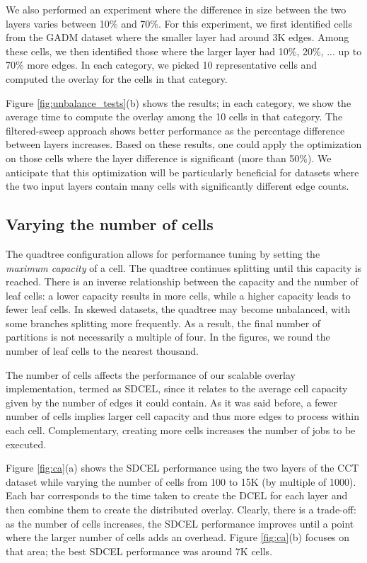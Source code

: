We also performed an experiment where the difference in size between the two layers varies between 10\% and 70\%. For this experiment, we first identified cells from the GADM dataset where the smaller layer had around 3K edges. Among these cells, we then identified those where the larger layer had 10\%, 20\%, ... up to 70\% more edges. In each category, we picked 10 representative cells and computed the overlay for the cells in that category.

Figure \ref{fig:unbalance_tests}(b) shows the results; in each category, we show the average time to compute the overlay among the 10 cells in that category.  The filtered-sweep approach shows better performance as the percentage difference between layers increases. Based on these results, one could apply the optimization on those cells where the layer difference is significant (more than 50\%).  We anticipate that this optimization will be particularly beneficial for datasets where the two input layers contain many cells with significantly different edge counts.

\subsection{Varying the number of cells}
The quadtree configuration allows for performance tuning by setting the \textit{maximum capacity} of a cell. The quadtree continues splitting until this capacity is reached. There is an inverse relationship between the capacity and the number of leaf cells: a lower capacity results in more cells, while a higher capacity leads to fewer leaf cells. In skewed datasets, the quadtree may become unbalanced, with some branches splitting more frequently. As a result, the final number of partitions is not necessarily a multiple of four. In the figures, we round the number of leaf cells to the nearest thousand.

The number of cells affects the performance of our scalable overlay implementation, termed as SDCEL, since it relates to the average cell capacity given by the number of edges it could contain. As it was said before, a fewer number of cells implies larger cell capacity and thus more edges to process within each cell.  Complementary, creating more cells increases the number of jobs to be executed.

Figure \ref{fig:ca}(a) shows the SDCEL performance using the two layers of the CCT dataset while varying the number of cells from 100 to 15K (by multiple of 1000). Each bar corresponds to the time taken to create the DCEL for each layer and then combine them to create the distributed overlay. Clearly, there is a trade-off: as the number of cells increases, the SDCEL performance improves until a point where the larger number of cells adds an overhead. Figure \ref{fig:ca}(b) focuses on that area; the best SDCEL performance was around 7K cells.

